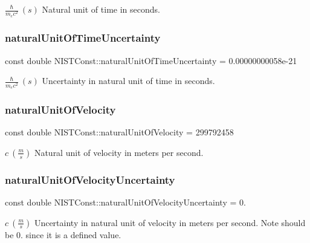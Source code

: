 $\frac{\hbar}{m_e c^2} \ (s)$ Natural unit of time in seconds. \mbox{\label{group___natural_unit_gabb48c3143ddc02570de65d6fe02a7c7b}} 
\subsubsection{\texorpdfstring{natural\+Unit\+Of\+Time\+Uncertainty}{naturalUnitOfTimeUncertainty}}
{\footnotesize\ttfamily const double N\+I\+S\+T\+Const\+::natural\+Unit\+Of\+Time\+Uncertainty = 0.\+00000000058e-\/21}

$\frac{\hbar}{m_e c^2} \ (s)$ Uncertainty in natural unit of time in seconds. \mbox{\label{group___natural_unit_ga4dcc4091af025cbd895e8bea1e265c32}} 
\subsubsection{\texorpdfstring{natural\+Unit\+Of\+Velocity}{naturalUnitOfVelocity}}
{\footnotesize\ttfamily const double N\+I\+S\+T\+Const\+::natural\+Unit\+Of\+Velocity = 299792458}

$c \ (\frac{m}{s})$ Natural unit of velocity in meters per second. \mbox{\label{group___natural_unit_ga68827b9e5fea839db077836f3ace3aa5}} 
\subsubsection{\texorpdfstring{natural\+Unit\+Of\+Velocity\+Uncertainty}{naturalUnitOfVelocityUncertainty}}
{\footnotesize\ttfamily const double N\+I\+S\+T\+Const\+::natural\+Unit\+Of\+Velocity\+Uncertainty = 0.}

$c \ (\frac{m}{s})$ Uncertainty in natural unit of velocity in meters per second. Note should be 0. since it is a defined value. 